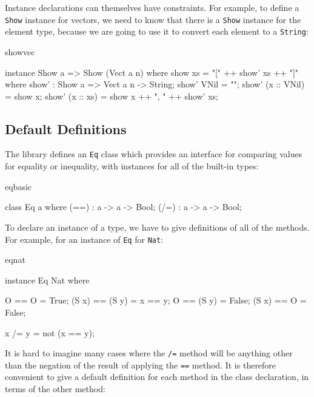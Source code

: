 \noindent
Instance declarations can themselves have constraints. For example, to define a
\texttt{Show} instance for vectors, we need to know that there is a \texttt{Show} 
instance for the element type, because we are going to use it to convert each element
to a \texttt{String}:

\begin{SaveVerbatim}{showvec}

instance Show a => Show (Vect a n) where {
    show xs = "[" ++ show' xs ++ "]" where {
        show' : Show a => Vect a n -> String;
        show' VNil = "";
        show' (x :: VNil) = show x;
        show' (x :: xs) = show x ++ ", " ++ show' xs;
    }
}

\end{SaveVerbatim}

\subsection{Default Definitions}

The library defines an \texttt{Eq} class which provides an interface for comparing
values for equality or inequality, with instances for all of the built-in types:

\begin{SaveVerbatim}{eqbasic}

class Eq a where {
    (==) : a -> a -> Bool;
    (/=) : a -> a -> Bool;
}

\end{SaveVerbatim}

\noindent
To declare an instance of a type, we have to give definitions of all of the methods.
For example, for an instance of \texttt{Eq} for \texttt{Nat}:

\begin{SaveVerbatim}{eqnat}

instance Eq Nat where {
    O     == O     = True;
    (S x) == (S y) = x == y;
    O     == (S y) = False;
    (S x) == O     = False;

    x /= y = not (x == y);
}

\end{SaveVerbatim}

\noindent
It is hard to imagine many cases where the \texttt{/=} method will be anything other
than the negation of the result of applying the \texttt{==} method. It is therefore
convenient to give a default definition for each method in the class
declaration, in terms of the other method:

